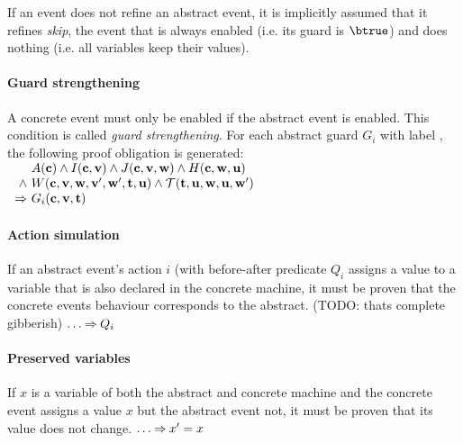 If an event does not refine an abstract event, it is implicitly assumed that it refines \emph{skip}, the
  event that is always enabled (i.e. its guard is $\btrue$) and does nothing (i.e. all variables keep their
  values).

\paragraph{Guard strengthening}
\label{guard_strengthening}
A concrete event must only be enabled if the abstract event is enabled.
This condition is called \emph{guard strengthening}.
For each abstract guard $G_i$ with label , the following
proof obligation is generated:
%
{}%
{$\begin{array}{r@{\ }l}
   & \axioms \land \absinvariants \land \concinvariants
  \land \concguards \\
  \land & \witnesspred
  \land \concbeforeafter(\allparameters,\concvariables,\concparameters,\concvariables')  \\
  \limp & G_i(\allconstants,\absvariables,\absparameters)
  \end{array}$}

\paragraph{Action simulation}
\label{action_simulation}
If an abstract event's action $i$ (with before-after predicate $Q_i$ 
  assigns a value to a variable
  that is also declared in the concrete machine,
  it must be proven that the concrete events behaviour
  corresponds to the abstract. (TODO: thats complete gibberish)
%
  {}%
  {$\ldots \mathbin\Rightarrow Q_i$}

\paragraph{Preserved variables}
\label{preserved_variables}
If $x$ is a variable of both the abstract and concrete machine and
  the concrete event assigns a value $x$ but the abstract event not,
  it must be proven that its value does not change.
%
  {}%
  {$\ldots \mathbin\Rightarrow x'=x$}

